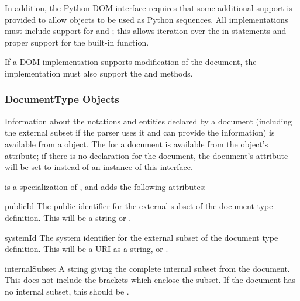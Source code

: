 In addition, the Python DOM interface requires that some additional
support is provided to allow  objects to be used as
Python sequences.  All  implementations must include
support for  and ; this allows
iteration over the  in  statements and
proper support for the  built-in function.

If a DOM implementation supports modification of the document, the
 implementation must also support the
 and  methods.


\subsubsection{DocumentType Objects \label{dom-documenttype-objects}}

Information about the notations and entities declared by a document
(including the external subset if the parser uses it and can provide
the information) is available from a  object.  The
 for a document is available from the
 object's  attribute; if there is no
 declaration for the document, the document's
 attribute will be set to  instead of an
instance of this interface.

 is a specialization of , and adds the
following attributes:

\begin{memberdesc}[DocumentType]{publicId}
  The public identifier for the external subset of the document type
  definition.  This will be a string or .
\end{memberdesc}

\begin{memberdesc}[DocumentType]{systemId}
  The system identifier for the external subset of the document type
  definition.  This will be a URI as a string, or .
\end{memberdesc}

\begin{memberdesc}[DocumentType]{internalSubset}
  A string giving the complete internal subset from the document.
  This does not include the brackets which enclose the subset.  If the
  document has no internal subset, this should be .
\end{memberdesc}

